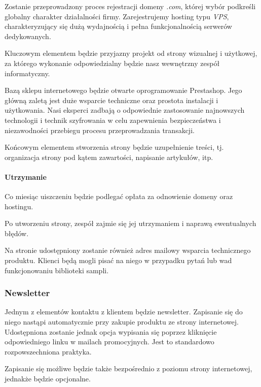 \documentclass[12pt]{article}
\begin{document}
Zostanie przeprowadzony proces rejestracji domeny \textit{.com}, której wybór podkreśli globalny charakter działalności firmy.
Zarejestrujemy hosting typu \textit{VPS}, charakteryzujący się dużą wydajnością i pełna funkcjonalnością serwerów dedykowanych.

Kluczowym elementem będzie przyjazny projekt od strony wizualnej i użytkowej, za którego wykonanie odpowiedzialny będzie nasz wewnętrzny zespół informatyczny.

Bazą sklepu internetowego będzie otwarte oprogramowanie Prestashop.
Jego główną zaletą jest duże wsparcie techniczne oraz prostota instalacji i użytkowania.
Nasi eksperci zadbają o odpowiednie zastosowanie najnowszych technologii i technik szyfrowania w celu zapewnienia bezpieczeństwa i niezawodności przebiegu procesu przeprowadzania transakcji.

Końcowym elementem stworzenia strony będzie uzupełnienie treści, tj. organizacja strony pod kątem zawartości, napisanie artykułów, itp.

\paragraph{Utrzymanie}

Co miesiąc uiszczeniu będzie podlegać opłata za odnowienie domeny oraz hostingu.

Po utworzeniu strony, zespół zajmie się jej utrzymaniem i naprawą ewentualnych błędów.

Na stronie udostępniony zostanie również adres mailowy wsparcia technicznego produktu.
Klienci będą mogli pisać na niego w przypadku pytań lub wad funkcjonowaniu biblioteki sampli.

\subsubsection{Newsletter}

Jednym z elementów kontaktu z klientem będzie newsletter.
Zapisanie się do niego nastąpi automatycznie przy zakupie produktu ze strony internetowej.
Udostępniona zostanie jednak opcja wypisania się poprzez kliknięcie odpowiedniego linku w mailach promocyjnych.
Jest to standardowo rozpowszechniona praktyka.

Zapisanie się możliwe będzie także bezpośrednio z poziomu strony internetowej, jednakże będzie opcjonalne.
\end{document}

